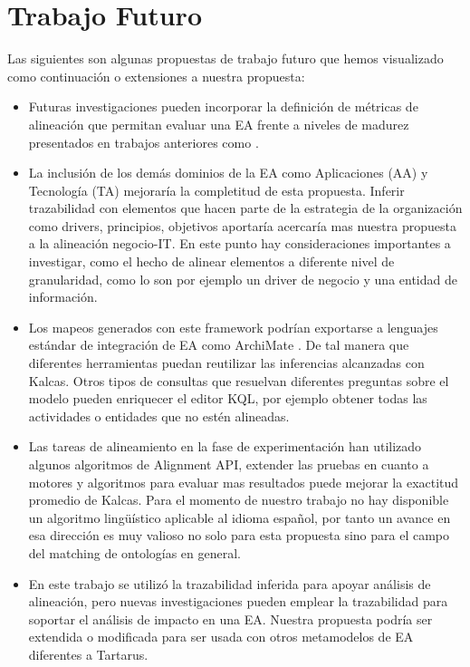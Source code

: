 \section{Trabajo Futuro} \label{sec:futurework}

Las siguientes son algunas propuestas de trabajo futuro que hemos visualizado como continuaci\'on o extensiones a nuestra propuesta:

\begin{itemize}

\item Futuras investigaciones pueden incorporar la definici\'on de m\'etricas de alineaci\'on que permitan evaluar una EA frente a niveles de madurez presentados en trabajos anteriores como \cite{Elhari:2011}.

\item La inclusi\'on de los dem\'as dominios de la EA como Aplicaciones (AA) y Tecnolog\'ia (TA) mejorar\'ia la completitud de esta propuesta. Inferir trazabilidad con elementos que hacen parte de la estrategia de la organizaci\'on como drivers, principios, objetivos aportar\'ia acercar\'ia mas nuestra propuesta a la alineaci\'on negocio-IT. En este punto hay consideraciones importantes a investigar, como el hecho de alinear elementos a diferente nivel de granularidad, como lo son por ejemplo un driver de negocio y una entidad de informaci\'on.

\item Los mapeos generados con este framework podr\'ian exportarse a lenguajes est\'andar de integraci\'on de EA como ArchiMate \cite{Jonkers:2004}. De tal manera que diferentes herramientas puedan reutilizar las inferencias alcanzadas con Kalcas. Otros tipos de consultas que resuelvan diferentes preguntas sobre el modelo pueden enriquecer el editor KQL, por ejemplo obtener todas las actividades o entidades que no est\'en alineadas.

\item Las tareas de alineamiento en la fase de experimentaci\'on han utilizado algunos algoritmos de Alignment API, extender las pruebas en cuanto a motores y algoritmos para evaluar mas resultados puede mejorar la exactitud promedio de Kalcas. Para el momento de nuestro trabajo no hay disponible un algoritmo ling\"u\'istico aplicable al idioma espa\~nol, por tanto un avance en esa direcci\'on es muy valioso no solo para esta propuesta sino para el campo del matching de ontolog\'ias en general. 

\item En este trabajo se utiliz\'o la trazabilidad inferida para apoyar an\'alisis de alineaci\'on, pero nuevas investigaciones pueden emplear la trazabilidad para soportar el an\'alisis de impacto en una EA. Nuestra propuesta podr\'ia ser extendida o modificada para ser usada con otros metamodelos de EA diferentes a Tartarus.

\end{itemize}

